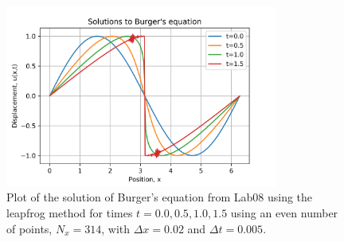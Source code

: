 \documentclass{article}
\begin{document}
\begin{figure}[H]
	\centering
	\includegraphics[width=0.8\textwidth]{../images/burgers_old.png}
	\caption{Plot of the solution of Burger's equation from Lab08 using the leapfrog method for times $t=0.0,0.5,1.0,1.5$ using an even number of points, $N_x=314$, with $\Delta x=0.02$ and $\Delta t=0.005$.}
	\label{fig:burgers_leapfrog}
\end{figure}
\end{document}
